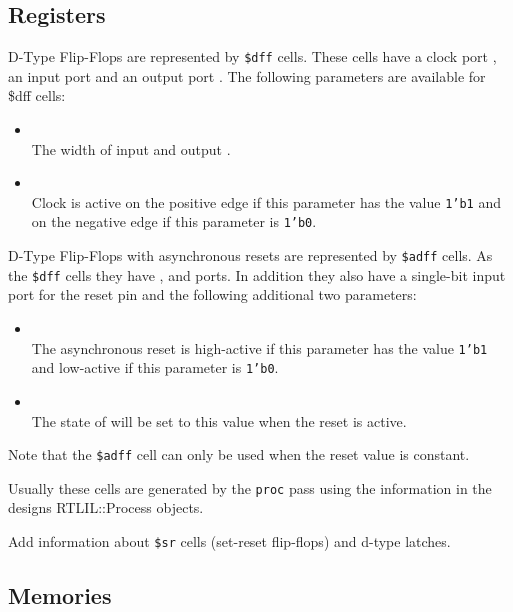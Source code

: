 \subsection{Registers}

D-Type Flip-Flops are represented by {\tt \$dff} cells. These cells have a clock port ,
an input port  and an output port . The following parameters are available for \$dff
cells:

\begin{itemize}
\item {} \\
The width of input  and output .

\item {} \\
Clock is active on the positive edge if this parameter has the value {\tt 1'b1} and on the negative
edge if this parameter is {\tt 1'b0}.
\end{itemize}

D-Type Flip-Flops with asynchronous resets are represented by {\tt \$adff} cells. As the {\tt \$dff}
cells they have ,  and  ports. In addition they also have a single-bit 
input port for the reset pin and the following additional two parameters:

\begin{itemize}
\item {} \\
The asynchronous reset is high-active if this parameter has the value {\tt 1'b1} and low-active
if this parameter is {\tt 1'b0}.

\item {} \\
The state of  will be set to this value when the reset is active.
\end{itemize}

Note that the {\tt \$adff} cell can only be used when the reset value is constant.

\begin{sloppypar}
Usually these cells are generated by the {\tt proc} pass using the information
in the designs RTLIL::Process objects.
\end{sloppypar}

\begin{fixme}
Add information about {\tt \$sr} cells (set-reset flip-flops) and d-type latches.
\end{fixme}

\subsection{Memories}
\label{sec:memcells}

